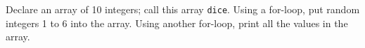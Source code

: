 Declare an array of 10 integers; call this array \texttt{dice}. Using a for-loop, put random integers 1 to 6 into the array. Using another for-loop, print all the values in the array.

